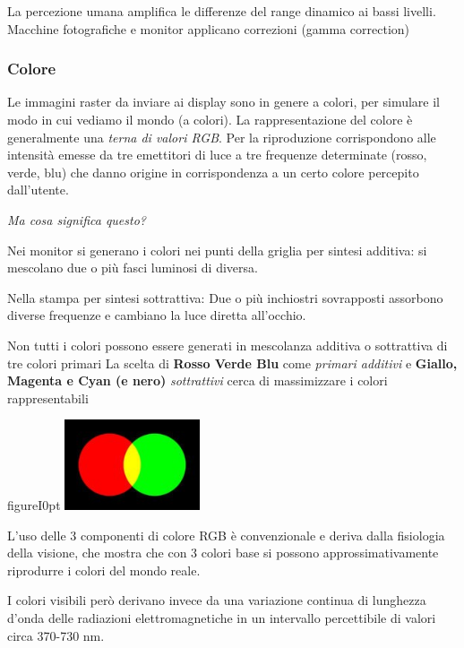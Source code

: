 \documentclass[a4paper, 10pt]{article}
\begin{document}
		\noindent
		La percezione umana amplifica le differenze del range dinamico ai bassi livelli. Macchine fotografiche e monitor applicano correzioni (gamma correction)
		
		\subsubsection{Colore}
			Le immagini raster da inviare ai display sono in genere a colori,
			per simulare il modo in cui vediamo il mondo (a colori).
			La rappresentazione del colore è generalmente una \textit{terna di
			valori RGB}.
			Per la riproduzione corrispondono alle intensità emesse da tre
			emettitori di luce a tre frequenze determinate (rosso, verde,
			blu) che danno origine in corrispondenza a un certo colore
			percepito dall'utente.
			
			\noindent
			\textit{Ma cosa significa questo?}
			
			\noindent
			Nei monitor si generano i colori nei punti della griglia per
			sintesi additiva: si mescolano due o più fasci luminosi di
			diversa.
			
			\noindent
			Nella stampa per sintesi sottrattiva: Due o più inchiostri
			sovrapposti assorbono diverse frequenze e cambiano la luce
			diretta all'occhio.
			
			\noindent
			Non tutti i colori possono essere generati in mescolanza
			additiva o sottrattiva di tre colori primari
			La scelta di \textbf{Rosso Verde Blu} come \textit{primari additivi} e \textbf{Giallo,
			Magenta e Cyan (e nero)} \textit{sottrattivi} cerca di massimizzare i
			colori rappresentabili
		
			\begin{wrapfloat}{figure}{I}{0pt}
				\includegraphics[width=0.3\textwidth]{colors}
			\end{wrapfloat}
		
			\noindent
			L'uso delle 3 componenti di colore RGB è
			convenzionale e deriva dalla fisiologia della
			visione, che mostra che con 3 colori base si
			possono approssimativamente riprodurre i
			colori del mondo reale.
			
			\noindent
			I colori visibili però derivano invece da una
			variazione continua di lunghezza d'onda delle
			radiazioni elettromagnetiche in un intervallo
			percettibile di valori circa 370-730 nm.
			
\end{document}
